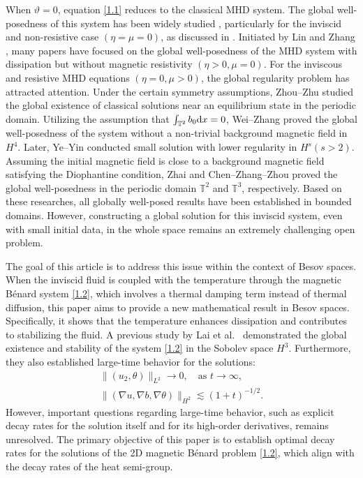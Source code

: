 \documentclass[reqno]{amsart}
\begin{document}
When $\vartheta=0$, equation \eqref{1.1} reduces to the classical MHD system.
The global well-posedness of this system has been widely studied \cite{MR2418123,MR346289,MR716200}, particularly for the inviscid and non-resistive case
 $(\eta=\mu=0)$, as discussed in \cite{MR920153,MR3780143,MR3738384}.
 Initiated by Lin and Zhang \cite{MR3168121}, many papers
\cite{MR3666563, MR3780143, MR3851055, MR4339533, MR4641656,MR3377532, MR3210038, MR3678491,
MR3448784}
have focused on the global well-posedness of the MHD system with dissipation but without magnetic resistivity $(\eta>0,\mu=0)$.
For the inviscous and resistive MHD equations $(\eta=0,\mu>0)$, the global regularity problem has attracted attention. Under the certain symmetry assumptions, Zhou--Zhu \cite{MR3843627} studied
the global existence of classical solutions near an equilibrium state in the periodic domain.
Utilizing the assumption that $\int_{\mathbb{T}^2}b_0{\rm d}x=0$, Wei--Zhang \cite{MR4199961}
proved the global well-posedness of the system without a non-trivial background magnetic field in
$H^4$. Later, Ye--Yin \cite{MR4496608} conducted small solution with lower regularity in $H^s (s>2)$. Assuming the initial magnetic field is close to a background magnetic field satisfying the Diophantine condition, Zhai \cite{MR4624442} and Chen--Zhang--Zhou \cite{MR4372923} proved the global well-posedness in the periodic domain $\mathbb{T}^2$ and $\mathbb{T}^3$, respectively. Based on these researches, all globally well-posed results have been established in bounded domains. However, constructing a global solution for this inviscid system, even with small initial data, in the whole space remains an extremely challenging open problem.

 The goal of this article is to address this issue within the context of Besov spaces.
When the inviscid fluid is coupled with the temperature through the magnetic B\'enard system
\eqref{1.2}, which involves a thermal damping term instead of thermal diffusion, this paper aims to
provide a new mathematical result in Besov spaces. Specifically, it shows that the temperature
enhances dissipation and contributes to stabilizing the fluid. A previous study by Lai et al.\
\cite{MR4790886} demonstrated the global existence and stability of the system \eqref{1.2} in the
Sobolev space $H^3$. Furthermore, they also established large-time behavior for the solutions:
\begin{equation} \label{1.1.1}
\begin{aligned}
 \|(u_2,\theta)\|_{L^2}\to 0,\quad\text{as } t\to\infty, \\
 \|(\nabla u,\nabla b,\nabla\theta)\|_{H^2}\lesssim(1+t) ^{-1/2}.
\end{aligned}
\end{equation}
However, important questions regarding large-time behavior, such as explicit decay rates for the
solution itself and for its high-order derivatives, remains unresolved.
The primary objective of this paper is to establish optimal decay rates for the solutions of the 2D
magnetic B\'enard problem \eqref{1.2}, which align with the decay rates of the heat semi-group.
\end{document}
